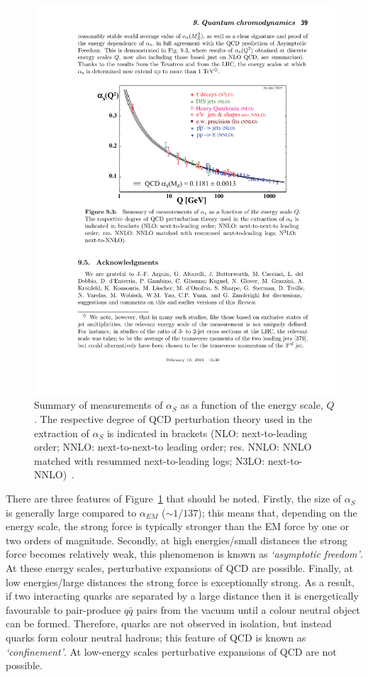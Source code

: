 \begin{figure}[!hbt]
  \begin{center}
    \includegraphics[width=0.7\linewidth, angle=0]{figs/Theory/qcd_running.pdf}
  \end{center}
  \caption[Summary of measurements of $\alpha_S$ as a function of the energy scale, $Q$.]
          {Summary of measurements of $\alpha_S$ as a function of the energy scale, $Q$.
            The respective degree of QCD perturbation theory used in the extraction of $\alpha_S$ is indicated in brackets
            (NLO: next-to-leading order; NNLO: next-to-next-to leading order; res. NNLO: NNLO matched with resummed next-to-leading logs; N3LO: next-to-NNLO)~\cite{obj-bjets_PDG}.}
  \label{fig:theo-qcd_running}
\end{figure}

There are three features of Figure~\ref{fig:theo-qcd_running} that should be noted.
Firstly, the size of $\alpha_S$ is generally large compared to $\alpha_{EM}$ ($\sim 1/137$);
this means that, depending on the energy scale, the strong force is typically stronger than the EM force by one or two orders of magnitude.
Secondly, at high energies/small distances the strong force becomes relatively weak, this phenomenon is known as
\textit{`asymptotic freedom'}.
At these energy scales, perturbative expansions of QCD are possible.
Finally, at low energies/large distances the strong force is exceptionally strong.
As a result, if two interacting quarks are separated by a large distance then it is energetically favourable to
pair-produce $q\bar{q}$ pairs from the vacuum until a colour neutral object can be formed.
Therefore, quarks are not observed in isolation, but instead quarks form colour neutral hadrons; this feature of QCD is known as \textit{`confinement'}.
At low-energy scales perturbative expansions of QCD are not possible.

